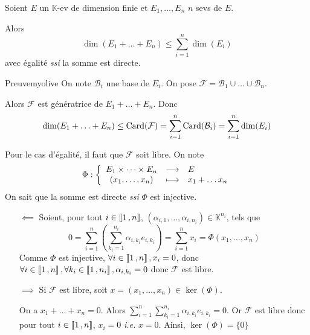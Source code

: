     \begin{prop}{}{}
        Soient $E$ un $\mathbb{K}$-ev de dimension finie et $E_1,\ldots,E_n$ $n$ sevs de $E$.

        Alors 
        \[ \dim(E_1 + \ldots + E_n) \leq \sum_{i=1}^{n} \dim(E_i) \]   
        avec égalité \textit{ssi} la somme est directe.
    \end{prop}

    \begin{demo}{Preuve}{myolive}
        On note $\mathcal{B}_i$ une base de $E_i$. On pose $\mathcal{F} = \mathcal{B}_1 \cup \ldots \cup \mathcal{B}_n$.

        Alors $\mathcal{F}$ est génératrice de $E_1 + \ldots + E_n$. Donc 
        \[ \dim(E_1 + \ldots + E_n) \leq \operatorname{Card}(\mathcal{F}) = \sum_{i=1}^{n} \operatorname{Card}(\mathcal{B}_i) = \sum_{i=1}^{n} \dim(E_i) \]

        Pour le cas d’égalité, il faut que $\mathcal{F}$ soit libre. On note 
        \[ \fonction{\Phi}{E_1 \times \cdots \times E_n}{E}{(x_1,\ldots,x_n)}{x_1 + \ldots x_n} \]
        On sait que la somme est directe \textit{ssi} $\Phi$ est injective.
        \begin{itemize}
            \item[\textcolor{myolive}{$\impliedby$}] Soient, pour tout $i \in \left\llbracket 1 \, , n \right\rrbracket$, $(\alpha_{i,1}, \ldots, \alpha_{i,n_i}) \in \mathbb{K}^{n_i}$, tels que 
            \[ 0 = \sum_{i=1}^{n} \left(\sum_{k_i = 1}^{n_i} \alpha_{i,k_i} e_{i, k_i}\right) = \sum_{i=1}^{n} x_i = \Phi(x_1,\ldots,x_n) \]
            Comme $\Phi$ est injective, $\forall i \in \left\llbracket 1 \, , n \right\rrbracket, x_i = 0$, donc $\forall i \in \left\llbracket 1 \, , n \right\rrbracket, \forall k_i \in \left\llbracket 1 \, , n_i \right\rrbracket, \alpha_{i,k_i} = 0$ donc $\mathcal{F}$ est libre.
            \item[\textcolor{myolive}{$\implies$}] Si $\mathcal{F}$ est libre, soit $x = (x_1,\ldots,x_n) \in \ker(\Phi)$. 
            
            On a $x_1 + \ldots + x_n = 0$. Alors $\sum_{i=1}^{n} \sum_{k_i = 1}^{n_i} \alpha_{i, k_i} e_{i, k_i} = 0$. Or $\mathcal{F}$ est libre donc pour tout $i \in \left\llbracket 1 \, , n \right\rrbracket$, $x_i = 0$ \textit{i.e.} $x = 0$. Ainsi, $\ker(\Phi) = \{0\}$
        \end{itemize}
    \end{demo}

